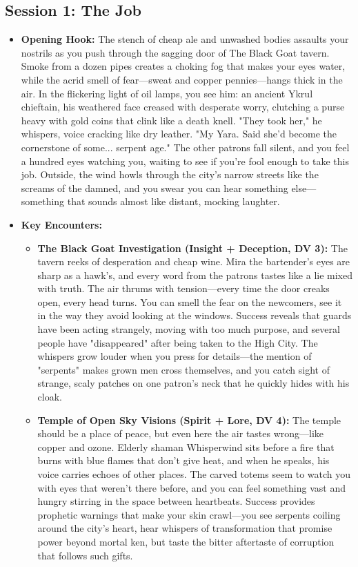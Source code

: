 \documentclass[11pt]{article}
\begin{document}
\subsection{Session 1: The Job}
\begin{itemize}
\item \textbf{Opening Hook:} The stench of cheap ale and unwashed bodies assaults your nostrils as you push through the sagging door of The Black Goat tavern. Smoke from a dozen pipes creates a choking fog that makes your eyes water, while the acrid smell of fear—sweat and copper pennies—hangs thick in the air. In the flickering light of oil lamps, you see him: an ancient Ykrul chieftain, his weathered face creased with desperate worry, clutching a purse heavy with gold coins that clink like a death knell. "They took her," he whispers, voice cracking like dry leather. "My Yara. Said she'd become the cornerstone of some... serpent age." The other patrons fall silent, and you feel a hundred eyes watching you, waiting to see if you're fool enough to take this job. Outside, the wind howls through the city's narrow streets like the screams of the damned, and you swear you can hear something else—something that sounds almost like distant, mocking laughter.
\item \textbf{Key Encounters:}
  \begin{itemize}
  \item \textbf{The Black Goat Investigation (Insight + Deception, DV 3):} The tavern reeks of desperation and cheap wine. Mira the bartender's eyes are sharp as a hawk's, and every word from the patrons tastes like a lie mixed with truth. The air thrums with tension—every time the door creaks open, every head turns. You can smell the fear on the newcomers, see it in the way they avoid looking at the windows. Success reveals that guards have been acting strangely, moving with too much purpose, and several people have "disappeared" after being taken to the High City. The whispers grow louder when you press for details—the mention of "serpents" makes grown men cross themselves, and you catch sight of strange, scaly patches on one patron's neck that he quickly hides with his cloak.
  \item \textbf{Temple of Open Sky Visions (Spirit + Lore, DV 4):} The temple should be a place of peace, but even here the air tastes wrong—like copper and ozone. Elderly shaman Whisperwind sits before a fire that burns with blue flames that don't give heat, and when he speaks, his voice carries echoes of other places. The carved totems seem to watch you with eyes that weren't there before, and you can feel something vast and hungry stirring in the space between heartbeats. Success provides prophetic warnings that make your skin crawl—you see serpents coiling around the city's heart, hear whispers of transformation that promise power beyond mortal ken, but taste the bitter aftertaste of corruption that follows such gifts.

\end{itemize}
\end{itemize}
\end{document}
